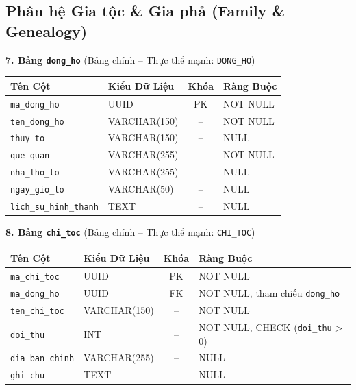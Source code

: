 \subsection{Phân hệ Gia tộc \& Gia phả (Family \& Genealogy)}
\label{subsec:2_2_2_family_genealogy}

\noindent\textbf{7. Bảng \texttt{dong\_ho}} \quad (Bảng chính -- Thực thể mạnh: \texttt{DONG\_HO})
\vspace{0.2cm}

\begin{center}
\small
\renewcommand{\arraystretch}{1.2}
\begin{tabular}{|p{3.8cm}|p{2.5cm}|c|p{6.5cm}|}
\hline
\textbf{Tên Cột} & \textbf{Kiểu Dữ Liệu} & \textbf{Khóa} & \textbf{Ràng Buộc} \\ \hline
\texttt{ma\_dong\_ho} & UUID & PK & NOT NULL \\ \hline
\texttt{ten\_dong\_ho} & VARCHAR(150) & -- & NOT NULL \\ \hline
\texttt{thuy\_to} & VARCHAR(150) & -- & NULL \\ \hline
\texttt{que\_quan} & VARCHAR(255) & -- & NOT NULL \\ \hline
\texttt{nha\_tho\_to} & VARCHAR(255) & -- & NULL \\ \hline
\texttt{ngay\_gio\_to} & VARCHAR(50) & -- & NULL \\ \hline
\texttt{lich\_su\_hinh\_thanh} & TEXT & -- & NULL \\ \hline
\end{tabular}
\end{center}
\vspace{0.3cm}

\noindent\textbf{8. Bảng \texttt{chi\_toc}} \quad (Bảng chính -- Thực thể mạnh: \texttt{CHI\_TOC})
\vspace{0.2cm}

\begin{center}
\small
\renewcommand{\arraystretch}{1.2}
\begin{tabular}{|p{3.8cm}|p{2.5cm}|c|p{6.5cm}|}
\hline
\textbf{Tên Cột} & \textbf{Kiểu Dữ Liệu} & \textbf{Khóa} & \textbf{Ràng Buộc} \\ \hline
\texttt{ma\_chi\_toc} & UUID & PK & NOT NULL \\ \hline
\texttt{ma\_dong\_ho} & UUID & FK & NOT NULL, tham chiếu \texttt{dong\_ho} \\ \hline
\texttt{ten\_chi\_toc} & VARCHAR(150) & -- & NOT NULL \\ \hline
\texttt{doi\_thu} & INT & -- & NOT NULL, CHECK (\texttt{doi\_thu} > 0) \\ \hline
\texttt{dia\_ban\_chinh} & VARCHAR(255) & -- & NULL \\ \hline
\texttt{ghi\_chu} & TEXT & -- & NULL \\ \hline
\end{tabular}
\end{center}
\vspace{0.3cm}

